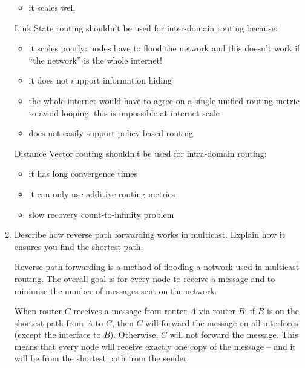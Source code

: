 \documentclass[10pt,\jkfside,a4paper]{article}
\begin{document}
\begin{enumerate}
\begin{itemize}
        \item it scales well

    \end{itemize}

    Link State routing shouldn't be used for inter-domain routing because:

    \begin{itemize}

        \item it scales poorly: nodes have to flood the network and this doesn't work if ``the network'' is the whole internet!

        \item it does not support information hiding

        \item the whole internet would have to agree on a single unified routing metric to avoid looping: this is impossible at internet-scale

        \item does not easily support policy-based routing

    \end{itemize}

    Distance Vector routing shouldn't be used for intra-domain routing:

    \begin{itemize}

        \item it has long convergence times

        \item it can only use additive routing metrics

        \item slow recovery \cf count-to-infinity problem

    \end{itemize}

    \item Describe how reverse path forwarding works in multicast. Explain how it ensures you find the shortest path.

    Reverse path forwarding is a method of flooding a network used in multicast routing. The overall goal is for every node to receive a message and to minimise the number of messages sent on the network.

    When router $C$ receives a message from router $A$ via router $B$: if $B$ is on the shortest path from $A$ to $C$, then $C$ will forward the message on all interfaces (except the interface to $B$). Otherwise,
    $C$ will not forward the message. This means that every node will receive exactly one copy of the message -- and it will be from the shortest path from the sender.


\end{enumerate}
\end{document}
